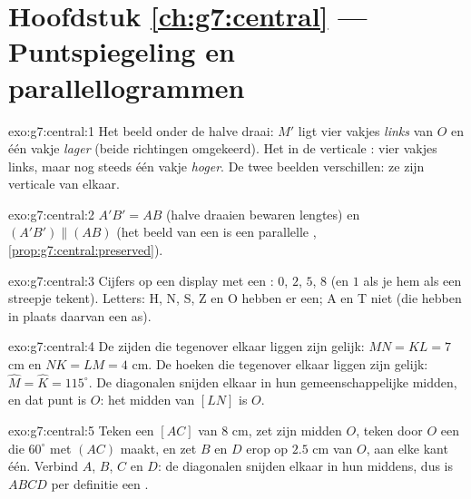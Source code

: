 \section*{Hoofdstuk \ref{ch:g7:central} --- Puntspiegeling en parallellogrammen}

\begin{solution}{exo:g7:central:1}
Het beeld onder de halve draai: $M'$ ligt vier vakjes \emph{links} van $O$ en één
vakje \emph{lager} (beide richtingen omgekeerd). Het  in de verticale
: vier vakjes links, maar nog steeds één vakje \emph{hoger}. De twee beelden
verschillen: ze zijn verticale  van elkaar.
\end{solution}

\begin{solution}{exo:g7:central:2}
$A'B' = AB$ (halve draaien bewaren lengtes) en $(A'B') \parallel (AB)$ (het beeld
van een  is een parallelle , \cref{prop:g7:central:preserved}).
\end{solution}

\begin{solution}{exo:g7:central:3}
Cijfers op een display met een : $0$, $2$, $5$, $8$ (en $1$ als je
hem als een streepje tekent). Letters: H, N, S, Z en O hebben er een; A en T niet
(die hebben in plaats daarvan een as).
\end{solution}

\begin{solution}{exo:g7:central:4}
De zijden die tegenover elkaar liggen zijn gelijk: $MN = KL = 7$ cm en
$NK = LM = 4$ cm. De hoeken die tegenover elkaar liggen zijn gelijk:
$\widehat M = \widehat K = 115^\circ$. De diagonalen snijden elkaar in hun
gemeenschappelijke midden, en dat punt is $O$: het midden van $[LN]$ is $O$.
\end{solution}

\begin{solution}{exo:g7:central:5}
Teken een  $[AC]$ van $8$ cm, zet zijn midden $O$, teken door $O$ een 
die $60^\circ$ met $(AC)$ maakt, en zet $B$ en $D$ erop op $2.5$ cm van $O$, aan elke
kant één. Verbind $A$, $B$, $C$ en $D$: de diagonalen snijden elkaar in hun middens,
dus is $ABCD$ per definitie een .
\end{solution}

